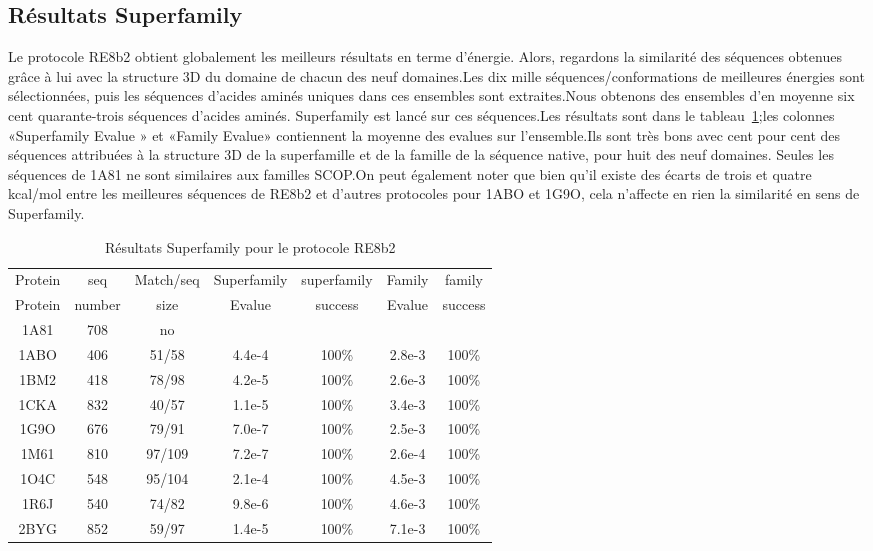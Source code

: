    \subsection{Résultats Superfamily}
Le protocole RE8b2 obtient globalement les meilleurs résultats en terme d'énergie. Alors, regardons la similarité des séquences obtenues grâce à lui avec la structure 3D du domaine de chacun des neuf domaines.Les dix mille séquences/conformations de meilleures énergies sont sélectionnées, puis les séquences d'acides aminés uniques dans ces ensembles sont extraites.Nous obtenons des ensembles d'en moyenne six cent quarante-trois séquences d'acides aminés. Superfamily est lancé sur ces séquences.Les résultats sont dans le tableau~\ref{tab:superfamily_bestRE};les colonnes «Superfamily Evalue » et «Family Evalue» contiennent la moyenne des evalues sur l'ensemble.Ils sont très bons avec cent pour cent des séquences attribuées à la structure 3D de la superfamille et de la famille de la séquence native, pour huit des neuf domaines. Seules les séquences de 1A81  ne sont similaires aux familles SCOP.On peut également noter que  bien qu'il existe des écarts de trois et quatre kcal/mol entre les meilleures séquences de RE8b2 et d'autres protocoles pour 1ABO et 1G9O, cela n'affecte en rien la similarité en sens de Superfamily.

    \begin{table}[h]
           \raggedleft{}

      \begin{tabular}{ccccccc}

        \toprule
        Protein & seq  & Match/seq & Superfamily & superfamily & Family & family \\
        Protein & number & size & Evalue & success & Evalue &  success\\
        \cmidrule{1-7}
        1A81 & 708 & no & & & & \\
        1ABO & 406 & 51/58  & 4.4e-4 & 100\% & 2.8e-3 & 100\% \\
        1BM2 & 418 & 78/98  & 4.2e-5 & 100\% & 2.6e-3 & 100\% \\
        1CKA & 832 & 40/57  & 1.1e-5 & 100\% & 3.4e-3 & 100\% \\
        1G9O & 676 & 79/91  & 7.0e-7 & 100\% & 2.5e-3 & 100\%  \\
        1M61 & 810 & 97/109 & 7.2e-7 & 100\% & 2.6e-4 &  100\% \\
        1O4C & 548 & 95/104 & 2.1e-4 & 100\% & 4.5e-3 &  100\% \\
        1R6J & 540 & 74/82  & 9.8e-6 & 100\% & 4.6e-3 &  100\% \\
        2BYG & 852 & 59/97  & 1.4e-5 & 100\% & 7.1e-3 &  100\% \\
        \bottomrule        
      \end{tabular}   
     \caption{Résultats Superfamily pour le protocole RE8b2}   
\label{tab:superfamily_bestRE}       
\end{table}

